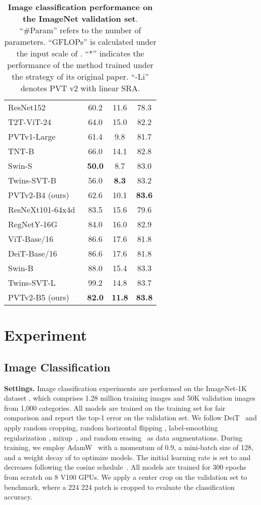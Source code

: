 \documentclass[10pt,twocolumn,letterpaper]{article}
\begin{document}
\begin{table}[t]
{\begin{tabular}{l|c|c|c}
	\hline
	ResNet152~\cite{he2016deep} & 60.2 & 11.6 & 78.3 \\
	T2T-ViT-24~~\cite{t2tvit} & 64.0 & 15.0 & 82.2 \\
	PVTv1-Large~~\cite{pvt} & 61.4 & 9.8 & 81.7 \\
	TNT-B~~\cite{tnt} & 66.0 & 14.1 & 82.8 \\
	Swin-S~~\cite{swin} & \textbf{50.0} & 8.7 & 83.0 \\
	Twins-SVT-B~\cite{twins} & 56.0 & \textbf{8.3} & 83.2 \\
PVTv2-B4 (ours) & 62.6 & 10.1 & \textbf{83.6} \\
	\hline
	ResNeXt101-64x4d~\cite{xie2017aggregated} & 83.5 & 15.6 & 79.6\\
	RegNetY-16G~\cite{regnet} & 84.0 & 16.0 & 82.9\\ 
	ViT-Base/16~\cite{dosovitskiy2020image} & 86.6 & 17.6 & 81.8 \\
	DeiT-Base/16~\cite{touvron2020training} & 86.6 & 17.6 & 81.8 \\
	Swin-B~\cite{swin} & 88.0 & 15.4 & 83.3 \\
	Twins-SVT-L~\cite{twins} & 99.2 & 14.8 & 83.7 \\
PVTv2-B5 (ours) & \textbf{82.0} & \textbf{11.8} & \textbf{83.8}\\
\end{tabular} }
		\caption{\textbf{Image classification performance on the ImageNet validation set}.
			``\#Param'' refers to the number of parameters. 
			``GFLOPs'' is calculated under the input scale of . ``*'' indicates the performance of the method trained under the strategy of its original paper.
			``-Li'' denotes PVT v2 with linear SRA.}
		\label{tab:cls}
	\end{table}
	
	\section{Experiment}
	\subsection{Image Classification}
	\noindent\textbf{Settings.}
	Image classification experiments are performed on the ImageNet-1K dataset \cite{russakovsky2015imagenet}, which comprises 1.28 million training images and 50K validation images from 1,000 categories. 
All models are trained on the training set for fair comparison and report the top-1 error on the validation set.
We follow DeiT~\cite{touvron2020training} and apply random cropping, random horizontal flipping \cite{szegedy2015going}, label-smoothing regularization \cite{szegedy2016rethinking}, mixup~\cite{zhang2017mixup}, and random erasing~\cite{zhong2020random} as data augmentations.
	During training, we employ AdamW~\cite{loshchilov2017decoupled} with a momentum of 0.9, a mini-batch size of 128, and a weight decay of  to optimize models. The initial learning rate is set to  and decreases following the cosine schedule~\cite{loshchilov2016sgdr}.  All models are trained for 300 epochs from scratch on 8 V100 GPUs.
	We apply a center crop on the validation set to benchmark, where a 224 224 patch is cropped to evaluate the classification accuracy. 
	
\end{document}
